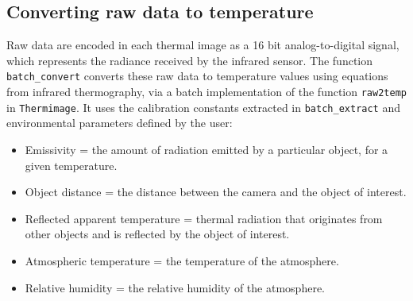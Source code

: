 \documentclass[12pt,british,a4paper,]{article}
\providecommand{\tightlist}{%
  \setlength{\itemsep}{0pt}\setlength{\parskip}{0pt}}
\begin{document}
\hypertarget{converting-raw-data-to-temperature}{%
\subsection{Converting raw data to temperature}\label{converting-raw-data-to-temperature}}

Raw data are encoded in each thermal image as a 16 bit analog-to-digital signal, which represents the radiance received by the infrared sensor. The function \texttt{batch\_convert} converts these raw data to temperature values using equations from infrared thermography, via a batch implementation of the function \texttt{raw2temp} in \texttt{Thermimage}. It uses the calibration constants extracted in \texttt{batch\_extract} and environmental parameters defined by the user:

\begin{itemize}
\tightlist
\item
  Emissivity = the amount of radiation emitted by a particular object, for a given temperature.
\item
  Object distance = the distance between the camera and the object of interest.
\item
  Reflected apparent temperature = thermal radiation that originates from other objects and is reflected by the object of interest.
\item
  Atmospheric temperature = the temperature of the atmosphere.
\item
  Relative humidity = the relative humidity of the atmosphere.
\end{itemize}
\end{document}
